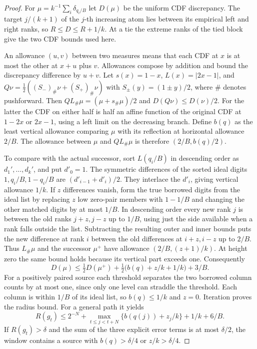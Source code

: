 \documentclass[11pt]{amsart}
\theoremstyle{definition}
\begin{document}
\begin{proof}
For \(\mu=k^{-1}\sum_i\delta_{q_i/B}\) let \(D(\mu)\) be the
uniform CDF discrepancy. The target \(j/(k+1)\) of the \(j\)-th
increasing atom lies between its empirical left and right
ranks, so \(R\le D\le R+1/k\). At a tie the extreme ranks of
the tied block give the two CDF bounds used here.

An allowance \((u,v)\) between two measures means that each CDF
at \(x\) is at most the other at \(x+u\) plus \(v\).
Allowances compose by addition and bound the discrepancy
difference by \(u+v\). Let \(s(x)=1-x\), \(L(x)=|2x-1|\), and
\(Q\nu=\tfrac12((S_-)_\#\nu+(S_+)_\#\nu)\) with
\(S_\pm(y)=(1\pm y)/2\), where \(\#\) denotes pushforward.
Then \(QL_\#\mu=(\mu+s_\#\mu)/2\) and \(D(Q\nu)\le D(\nu)/2\).
For the latter the CDF on either half is half an affine
function of the original CDF at \(1-2x\) or \(2x-1\),
using a left limit on the decreasing branch.
Define \(b(q)\) as the least vertical allowance comparing
\(\mu\) with its reflection at horizontal allowance \(2/B\).
The allowance between \(\mu\) and \(QL_\#\mu\) is therefore
\((2/B,b(q)/2)\).

To compare with the actual successor, sort \(L(q_i/B)\) in
descending order as \(d_1',\ldots,d_k'\), and put \(d'_0=1\).
The symmetric differences of the sorted ideal digits
\(1,q_i/B,1-q_i/B\) are \((d'_{i-1}+d'_i)/2\).
They interlace the \(d'_i\), giving vertical allowance \(1/k\).
If \(z\) differences vanish, form the true borrowed digits from
the ideal list by replacing \(z\) low zero-pair members with
\(1-1/B\) and changing the other matched digits by at most
\(1/B\). In descending order every new rank \(j\) is between
the old ranks \(j+z,j-z\) up to \(1/B\), using just the side
available when a rank falls outside the list.
Subtracting the resulting outer and inner bounds puts the new
difference at rank \(i\) between the old differences at
\(i+z,i-z\) up to \(2/B\). Thus \(L_\#\mu\) and the successor
\(\mu^+\) have allowance \((2/B,(z+1)/k)\).
At height zero the same bound holds because its vertical part
exceeds one. Consequently
\[
 D(\mu)\le\tfrac12 D(\mu^+)
       +\tfrac12\big(b(q)+z/k+1/k\big)+3/B.
\]
For a positively paired source each threshold separates the
two borrowed column counts by at most one, since only one level
can straddle the threshold. Each column is within \(1/B\) of
its ideal list, so \(b(q)\le1/k\) and \(z=0\).
Iteration proves the radius bound. For a general path it yields
\[
 R(g_t)\le2^{-N}+\max_{t\le j<t+N}\{b(q(j))+z_j/k\}+1/k+6/B.
\]
If \(R(g_t)>\delta\) and the sum of the three explicit error
terms is at most \(\delta/2\), the window contains a source
with \(b(q)>\delta/4\) or \(z/k>\delta/4\).


\end{proof}
\end{document}

